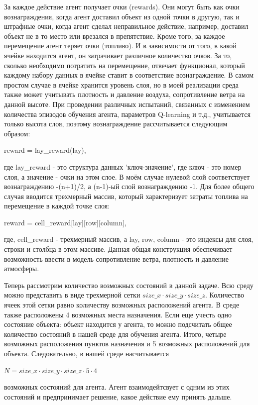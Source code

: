 \documentclass[a4paper]{report}
\theoremstyle{definition}
\theoremstyle{plain}
\theoremstyle{remark}
\theoremstyle{remark}
\theoremstyle{definition}
\begin{document}
За каждое действие агент получает очки (rewards). Они могут быть как очки вознаграждения, когда агент доставил объект из одной точки в другую, так и штрафные очки, когда агент сделал неправильное действие, например, доставил объект не в то место или врезался в препятствие. Кроме того, за каждое перемещение агент теряет очки (топливо). И в зависимости от того, в какой ячейке находится агент, он затрачивает различное количество очков. За то, сколько необходимо потратить на перемещение, отвечает функционал, который каждому набору данных в ячейке ставит в соответствие вознаграждение. В самом простом случае в ячейке хранится уровень слоя, но в моей реализации среда также может учитывать плотность и давление воздуха, сопротивление ветра на данной высоте. При проведении различных испытаний, связанных с изменением количества эпизодов обучения агента, параметров Q-learning и т.д., учитывается только высота слоя, поэтому вознаграждение рассчитывается следующим образом:
\begin{center}
    reward = lay\_reward(lay),
\end{center}
где lay\_reward - это структура данных 'ключ-значение', где ключ - это номер слоя, а значение - очки на этом слое. В моём случае нулевой слой соответствует вознаграждению -(n+1)/2, а (n-1)-ый слой вознаграждению -1. Для более общего случая вводится трехмерный массив, который характеризует затраты топлива на перемещение в каждой точке слоя:
\begin{center}
    reward = cell\_reward[lay][row][column],
\end{center}
где, cell\_reward - трехмерный массив, а lay, row, column - это индексы для слоя, строки и столбца в этом массиве. Данная общая конструкция обеспечивает возможность ввести в модель сопротивление ветра, плотность и давление атмосферы.

Теперь рассмотрим количество возможных состояний в данной задаче. Всю среду можно представить в виде трехмерной сетки $size\_x \cdot size\_y \cdot size\_z$. Количество ячеек этой сетки равно количеству возможных расположений агента. В среде также расположены 4 возможных места назначения. Если еще учесть одно состояние объекта: объект находится у агента, то можно подсчитать общее количество состояний в нашей среде для обучения агента. Итого, четыре возможных расположения пунктов назначения и 5 возможных расположений для объекта. Следовательно, в нашей среде насчитывается 
\begin{center}
    $N = size\_x \cdot size\_y \cdot size\_z \cdot 5 \cdot 4$
\end{center}
возможных состояний для агента. Агент взаимодейтсвует с одним из этих состояний и предпринимает решение, какое действие ему принять дальше.\\
\end{document}
